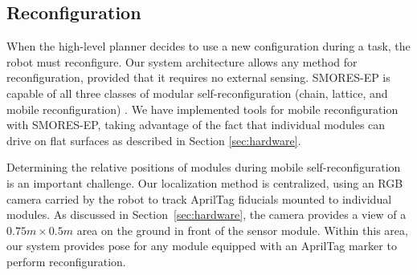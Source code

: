 \documentclass[journal]{IEEEtran}
\newcommand{\TODO}[1]{ {\bf \textcolor{red}{TODO:} #1 }}
\begin{document}
\subsection{Reconfiguration}
\label{sec:reconfiguration}
%
When the high-level planner decides to use a new configuration during a task, the robot must reconfigure. Our system architecture allows any method for reconfiguration, provided that it requires no external sensing. SMORES-EP is capable of all three classes of modular self-reconfiguration (chain, lattice, and mobile reconfiguration) \cite{Davey2012,yim2003modular}.  We have implemented tools for mobile reconfiguration with SMORES-EP, taking advantage of the fact that individual modules can drive on flat surfaces as described in Section \ref{sec:hardware}.

Determining the relative positions of modules during mobile self-reconfiguration is an important challenge. 
Our localization method is centralized, using an RGB camera carried by the robot to track AprilTag fiducials mounted to individual modules.  As discussed in Section~\ref{sec:hardware}, the camera provides a view of a $0.75m\times0.5m$ area on the ground in front of the sensor module.  
Within this area, our system provides pose for any module equipped with an AprilTag marker to perform reconfiguration. 
\end{document}
